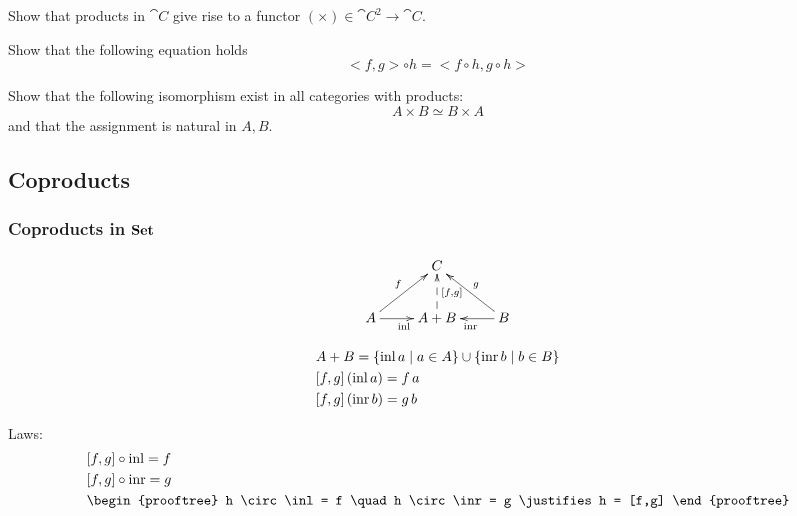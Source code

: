 \documentclass[handout]{beamer}
\newcommand{\ru}[2]{\vspace{1ex}
\begin{prooftree}
#1 \justifies #2
\end{prooftree}\vspace{1ex}}
\begin{document}
\begin{frame}
  \begin{exercise}
    Show that products in $\cat{C}$ give rise to a 
    functor $(\times) \in \cat{C}^2 \to \cat{C}$.
  \end{exercise}

  \begin{exercise}
    Show that the following equation holds
    \[ <f,g> \circ h = <f \circ h,g \circ h> \]
  \end{exercise}

  \begin{exercise}
    Show that the following isomorphism exist in all categories with products:
    \[ A \times B \simeq B \times A \]
    and that the assignment is natural in $A,B$.
  \end{exercise}


\end{frame}

\subsection{Coproducts}

\begin{frame}
  \frametitle{Coproducts in $\mathbf{Set}$}
  
  \[\xymatrix{
    & C \\
    A \ar[ur]^f \ar[r]_{\inl}& A + B \ar@{-->}[u]_{[f,g]}  & B \ar[l]^{\inr} \ar[ul]_g
  }\]

  \begin{align*}
    &  A + B = \{ \mathrm{inl}\, a \mid a\in A\} \cup \{ \mathrm{inr}\,b \mid b\in B \}\\
    & [f,g]\,(\mathrm{inl}\,a) = f\,a\\
    & [f,g]\,(\mathrm{inr}\,b) = g\,b
  \end{align*}

  Laws:\vspace{-2ex}
  \begin{align*}
    & [f,g] \circ \inl = f \\
    & [f,g] \circ \inr = g \\
    & \ru{h \circ \inl = f \quad h \circ \inr = g}
    { h = [f,g] }
  \end{align*}

\end{frame}
\end{document}
